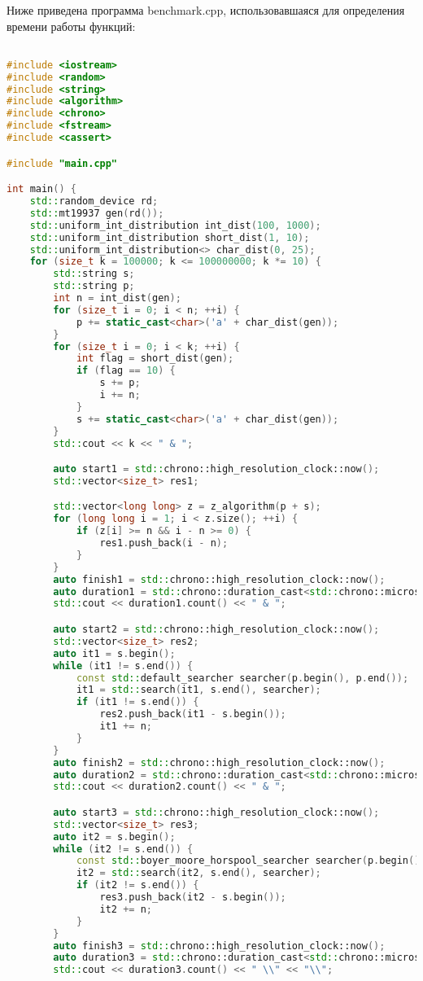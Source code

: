 \documentclass[12pt]{article}
\begin{document}
Ниже приведена программа benchmark.cpp, использовавшаяся для определения времени работы функций:

\begin{lstlisting}[language=C++]

#include <iostream>
#include <random>
#include <string>
#include <algorithm>
#include <chrono>
#include <fstream>
#include <cassert>

#include "main.cpp"

int main() {
    std::random_device rd;
    std::mt19937 gen(rd());
    std::uniform_int_distribution int_dist(100, 1000);
    std::uniform_int_distribution short_dist(1, 10);
    std::uniform_int_distribution<> char_dist(0, 25);
    for (size_t k = 100000; k <= 100000000; k *= 10) {
        std::string s;
        std::string p;
        int n = int_dist(gen);
        for (size_t i = 0; i < n; ++i) {
            p += static_cast<char>('a' + char_dist(gen));
        }
        for (size_t i = 0; i < k; ++i) {
            int flag = short_dist(gen);
            if (flag == 10) {
                s += p;
                i += n;
            }
            s += static_cast<char>('a' + char_dist(gen));
        }
        std::cout << k << " & ";

        auto start1 = std::chrono::high_resolution_clock::now();
        std::vector<size_t> res1;

        std::vector<long long> z = z_algorithm(p + s);
        for (long long i = 1; i < z.size(); ++i) {
            if (z[i] >= n && i - n >= 0) {
                res1.push_back(i - n);
            }
        }
        auto finish1 = std::chrono::high_resolution_clock::now();
        auto duration1 = std::chrono::duration_cast<std::chrono::microseconds>(finish1 - start1);
        std::cout << duration1.count() << " & ";

        auto start2 = std::chrono::high_resolution_clock::now();
        std::vector<size_t> res2;
        auto it1 = s.begin();
        while (it1 != s.end()) {
            const std::default_searcher searcher(p.begin(), p.end());
            it1 = std::search(it1, s.end(), searcher);
            if (it1 != s.end()) {
                res2.push_back(it1 - s.begin());
                it1 += n;
            }
        }
        auto finish2 = std::chrono::high_resolution_clock::now();
        auto duration2 = std::chrono::duration_cast<std::chrono::microseconds>(finish2 - start2);
        std::cout << duration2.count() << " & ";

        auto start3 = std::chrono::high_resolution_clock::now();
        std::vector<size_t> res3;
        auto it2 = s.begin();
        while (it2 != s.end()) {
            const std::boyer_moore_horspool_searcher searcher(p.begin(), p.end());
            it2 = std::search(it2, s.end(), searcher);
            if (it2 != s.end()) {
                res3.push_back(it2 - s.begin());
                it2 += n;
            }
        }
        auto finish3 = std::chrono::high_resolution_clock::now();
        auto duration3 = std::chrono::duration_cast<std::chrono::microseconds>(finish3 - start3);
        std::cout << duration3.count() << " \\" << "\\";


\end{lstlisting}
\end{document}
